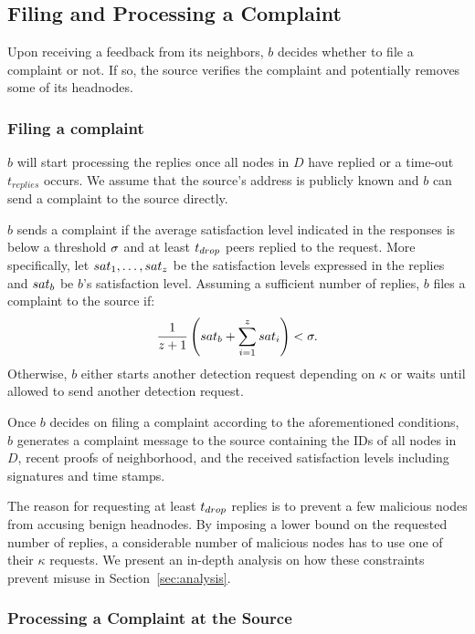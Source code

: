 \subsection{Filing and Processing a Complaint}

Upon receiving a feedback from its neighbors, $b$ decides whether to file a complaint or not.
If so, the source verifies the complaint and potentially removes some of its headnodes. 

\subsubsection*{Filing a complaint}
$b$ will start processing the replies once all nodes in $D$ have replied or a time-out $t_{replies}$ occurs. 
We assume that the source's address is publicly known and $b$ can send a complaint to the source directly.

$b$ sends a complaint if the average satisfaction level indicated in the responses is below a threshold $\sigma$ and at least $t_{drop}$ peers replied to the request. 
More specifically, let $sat_1, \ldots ,sat_z$ be the satisfaction levels expressed in the replies and $sat_b$ be $b$'s satisfaction level. 
Assuming a sufficient number of replies, $b$ files a complaint to the source if:
\begin{align}
\label{eq:drop_satis_equation}
\frac{1}{z+1}\left( \sat_b + \sum_{i=1}^{z} \sat_i \right) < \satThres. 
\end{align} 
Otherwise, $b$ either starts another detection request depending on $\kappa$ or waits until allowed to send another detection request.
 

Once $b$ decides on filing a complaint according to the aforementioned conditions, $b$ generates a complaint message to the source containing the IDs of all nodes in $D$, recent proofs of neighborhood,  and the received satisfaction levels including signatures and time stamps.  


The reason for requesting at least $t_{drop}$ replies is to prevent a few malicious nodes from accusing benign headnodes. By imposing a lower bound on the requested number of replies, a considerable number of malicious nodes has to use one of their $\kappa$ requests. We present an in-depth analysis on how these constraints prevent misuse in Section~\ref{sec:analysis}. 





\subsubsection*{Processing a Complaint at the Source}

